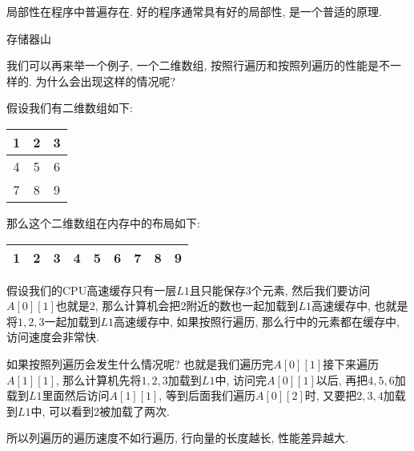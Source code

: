 \documentclass[oneside]{ctexbook}
\begin{document}
{局部性在程序中普遍存在. 好的程序通常具有好的局部性, 是一个普适的原理.

\begin{myfigure}[label={存储器山}]{存储器山}
\end{myfigure}

我们可以再来举一个例子, 一个二维数组, 按照行遍历和按照列遍历的性能是不一样的. 为什么会出现这样的情况呢?

假设我们有二维数组如下:

\begin{tabular}{|c|c|c|}
\hline
1 & 2 & 3 \\\hline
4 & 5 & 6 \\\hline
7 & 8 & 9 \\\hline
\end{tabular}

那么这个二维数组在内存中的布局如下:

\begin{tabular}{|c|c|c|c|c|c|c|c|c|}
\hline
1 & 2 & 3 & 4 & 5 & 6 & 7 & 8 & 9 \\\hline
\end{tabular}

假设我们的CPU高速缓存只有一层$L1$且只能保存3个元素, 然后我们要访问$A[0][1]$也就是$2$, 那么计算机会把$2$附近的数也一起加载到$L1$高速缓存中, 也就是将$1,2,3$一起加载到$L1$高速缓存中, 如果按照行遍历, 那么行中的元素都在缓存中, 访问速度会非常快.

如果按照列遍历会发生什么情况呢? 也就是我们遍历完$A[0][1]$接下来遍历$A[1][1]$, 那么计算机先将$1,2,3$加载到$L1$中, 访问完$A[0][1]$以后, 再把$4,5,6$加载到$L1$里面然后访问$A[1][1]$, 等到后面我们遍历$A[0][2]$时, 又要把$2,3,4$加载到$L1$中, 可以看到$2$被加载了两次.

所以列遍历的遍历速度不如行遍历, 行向量的长度越长, 性能差异越大.

}
\end{document}
